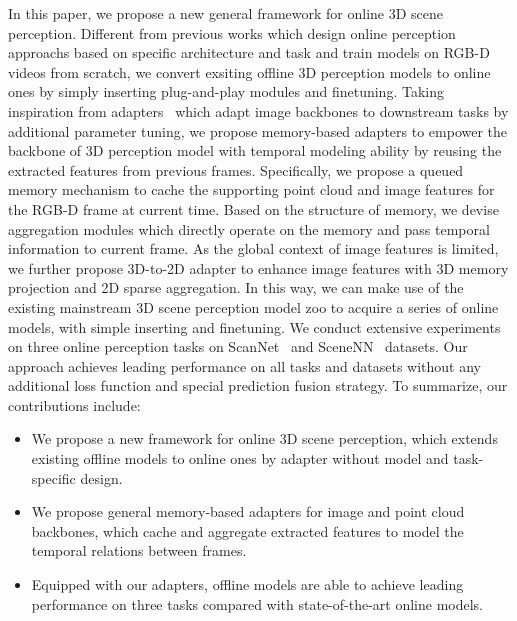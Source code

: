 In this paper, we propose a new general framework for online 3D scene perception. Different from previous works which design online perception approachs based on specific architecture and task and train models on RGB-D videos from scratch, we convert exsiting offline 3D perception models to online ones by simply inserting plug-and-play modules and finetuning.
Taking inspiration from adapters~\cite{pan2022st,chen2022vision} which adapt image backbones to downstream tasks by additional parameter tuning, we propose memory-based adapters to empower the backbone of 3D perception model with temporal modeling ability by reusing the extracted features from previous frames. 
Specifically, we propose a queued memory mechanism to cache the supporting point cloud and image features for the RGB-D frame at current time. Based on the structure of memory, we devise aggregation modules which directly operate on the memory and pass temporal information to current frame. As the global context of image features is limited, we further propose 3D-to-2D adapter to enhance image features with 3D memory projection and 2D sparse aggregation.
In this way, we can make use of the existing mainstream 3D scene perception model zoo to acquire a series of online models, with simple inserting and finetuning.
We conduct extensive experiments on three online perception tasks on ScanNet~\cite{dai2017scannet} and SceneNN~\cite{hua2016scenenn} datasets.
Our approach achieves leading performance on all tasks and datasets without any additional loss function and special prediction fusion strategy.
To summarize, our contributions include:
\begin{itemize}
    \item We propose a new framework for online 3D scene perception, which extends existing offline models to online ones by adapter without model and task-specific design.
    \item We propose general memory-based adapters for image and point cloud backbones, which cache and aggregate extracted features to model the temporal relations between frames.
    \item Equipped with our adapters, offline models are able to achieve leading performance on three tasks compared with state-of-the-art online models.
\end{itemize}